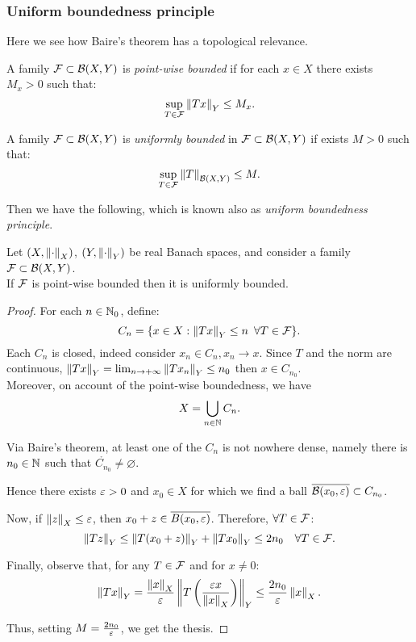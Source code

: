\subsubsection{Uniform boundedness principle} Here we see how Baire's theorem has a topological relevance.

\begin{defn}
	A family $\mathcal F \subset \mathcal B(X,Y)$ is \emph{point-wise bounded} if for each $x \in X$ there exists $M_x >0$ such that:
	$$
	\sup_{T \in \mathcal F} \left\lVert Tx\right\rVert_Y
	\leq M_x.$$
\end{defn}

\begin{defn}
	A family $\mathcal F \subset \mathcal B(X,Y)$ is \emph{uniformly bounded} in $\mathcal F \subset \mathcal B(X,Y)$ if exists $M>0$ such that:
	$$
	\sup_{T \in \mathcal F} \left\lVert T\right\rVert_{\mathcal B(X,Y)}
	\leq M.$$
\end{defn}

Then we have the following, which is known also as \emph{uniform boundedness principle}.

\begin{theo} \label{theo-banach-steinhaus}
	Let $(X,\left\lVert\cdot\right\rVert_X)$, $(Y,\left\lVert\cdot\right\rVert_Y)$ be real Banach spaces, and consider a family $\mathcal F \subset \mathcal B(X,Y)$.\\
	If $\mathcal F$ is point-wise bounded then it is uniformly bounded.
\end{theo}
\begin{proof}
	For each $n \in \mathbb N_0$, define:
	$$C_n = \{x \in X : \left\lVert Tx\right\rVert_Y \leq n \enspace \forall T \in \mathcal F \}.$$
	Each $C_{n}$ is closed, indeed consider $x_n \in C_n,x_n\to x$. Since $T$ and the norm are continuous, $\left\lVert Tx\right\rVert_Y =\lim\nolimits _{n\to +\infty} \left\lVert Tx_n\right\rVert_Y \leq n_0$ then $x\in C_{n_0}$.\\
	Moreover, on account of the point-wise boundedness, we have
	$$ X = \bigcup_{n\in\mathbb N} C_n.$$
	
	Via Baire's theorem, at least one of the $C_n$ is not nowhere dense, namely there is $n_0 \in \mathbb N$ such that $\mathring{C_{n_0}} \neq \varnothing$.
	
	Hence there exists $\varepsilon >0$ and $x_0 \in X$ for which we find a ball $\overline{\mathcal B(x_0,\varepsilon)} \subset C_{n_0}$.
	
	Now, if $\left\lVert z\right\rVert_X \leq \varepsilon$, then $x_0 + z \in \overline{B(x_0,\varepsilon)}$. Therefore, $\forall T \in \mathcal F$:
	$$\left\lVert Tz\right\rVert_Y \leq \left\lVert T(x_0+z)\right\rVert_Y + \left\lVert Tx_0\right\rVert_Y \leq 2 n_0 \quad \forall T \in \mathcal F.$$
	
	Finally, observe that, for any $T \in \mathcal F$ and for $x \neq 0$:
	$$\left\lVert Tx\right\rVert_Y = \frac{\left\lVert x\right\rVert_X}{\varepsilon} \left\lVert T\left( \frac{\varepsilon x}{\left\lVert x\right\rVert_X} \right)\right\rVert_Y \leq \frac{2 n_0}{\varepsilon}\left\lVert x\right\rVert_X.$$
	
	Thus, setting $M = \frac{2 n_0}{\varepsilon}$, we get the thesis.
\end{proof}

